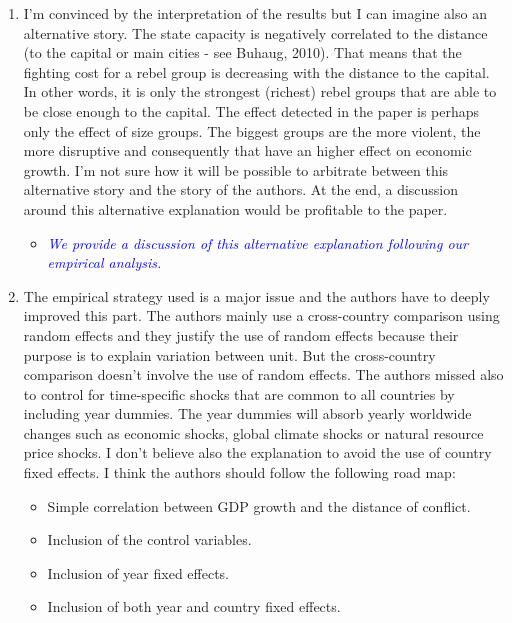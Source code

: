 \begin{enumerate}

\item  I’m convinced by the interpretation of the results but I can imagine also an alternative story. The state capacity is negatively correlated to the distance (to the capital or main cities - see Buhaug, 2010). That means that the fighting cost for a rebel group is decreasing with the distance to the capital. In other words, it is only the strongest (richest) rebel groups that are able to be close enough to the capital. The effect detected in the paper is perhaps only the effect of size groups. The biggest groups are the more violent, the more disruptive and consequently that have an higher effect on economic growth. I’m not sure how it will be possible to arbitrate between this alternative story and the story of the authors. At the end, a discussion around this alternative explanation would be profitable to the paper.

\begin{itemize}
\item \textcolor{blue}{\emph{
	We provide a discussion of this alternative explanation following our empirical analysis.
}}
\end{itemize}

\item The empirical strategy used is a major issue and the authors have to deeply improved this part. The authors mainly use a cross-country comparison using random effects and they justify the use of random effects because their purpose is to explain variation between unit. But the cross-country comparison doesn’t involve the use of random effects. The authors missed also to control for time-specific shocks that are common to all countries by including year dummies. The year dummies will absorb yearly worldwide changes such as economic shocks, global climate shocks or natural resource price shocks. I don’t believe also the explanation to avoid the use of country fixed effects. I think the authors should follow the following road map:
\begin{itemize}
\item Simple correlation between GDP growth and the distance of conflict.
\item Inclusion of the control variables.
\item Inclusion of year fixed effects.
\item Inclusion of both year and country fixed effects.
\end{itemize}


\end{enumerate}
